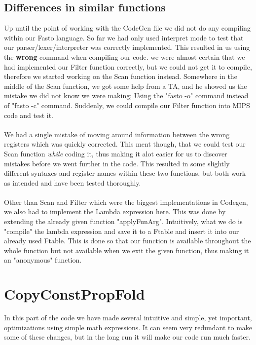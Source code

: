 \documentclass[12pt]{article}
\begin{document}
\subsection{Differences in similar functions}
Up until the point of working with the CodeGen file we did not do any compiling within our Fasto language. So far we had only used interpret mode to test that our parser/lexer/interpreter was correctly implemented. This resulted in us using the \textbf{wrong} command when compiling our code. we were almost certain that we had implemented our Filter function correctly, but we could not get it to compile, therefore we started working on the Scan function instead. Somewhere in the middle of the Scan function, we got some help from a TA, and he showed us the mistake we did not know we were making; Using the "fasto -o" command instead of "fasto -c" command. Suddenly, we could compile our Filter function into MIPS code and test it.\\\\ 
We had a single mistake of moving around information between the wrong registers which was quickly corrected. This ment though, that we could test our Scan function \textit{while} coding it, thus making it alot easier for us to discover mistakes before we went further in the code. This resulted in some slightly different syntaxes and register names within these two functions, but both work as intended and have been tested thoroughly. \\\\
Other than Scan and Filter which were the biggest implementations in Codegen, we also had to implement the Lambda expression here. This was done by extending the already given function "applyFunArg". Intuitively, what we do is "compile" the lambda expression and save it to a Ftable and insert it into our already used Ftable. This is done so that our function is available throughout the whole function but not available when we exit the given function, thus making it an "anonymous" function.

\section{CopyConstPropFold}
In this part of the code we have made several intuitive and simple, yet important, optimizations using simple math expressions. It can seem very redundant to make some of these changes, but in the long run it will make our code run much faster.
\end{document}
